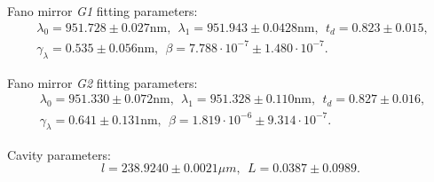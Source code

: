 Fano mirror \emph{G1} fitting parameters:
\begin{equation}
    \begin{split}
        &\lambda_0 = 951.728 \pm 0.027 \text{nm}, \:\: \lambda_1 = 951.943 \pm 0.0428 \text{nm}, \:\: t_d = 0.823 \pm 0.015, \:\: \\&\gamma_{\lambda} = 0.535 \pm 0.056 \text{nm}, \:\: \beta = 7.788 \cdot 10^{-7} \pm 1.480 \cdot 10^{-7}.
    \end{split}
\end{equation}

Fano mirror \emph{G2} fitting parameters:
\begin{equation}
    \begin{split}
        &\lambda_0 = 951.330 \pm 0.072 \text{nm}, \:\: \lambda_1 = 951.328 \pm 0.110 \text{nm}, \:\: t_d = 0.827 \pm 0.016, \:\: \\&\gamma_{\lambda} = 0.641 \pm 0.131 \text{nm}, \:\: \beta = 1.819 \cdot 10^{-6} \pm 9.314 \cdot 10^{-7}.
    \end{split}
\end{equation}

Cavity parameters:
\begin{equation}
    l = 238.9240 \pm 0.0021 \mu m, \:\: L = 0.0387 \pm 0.0989.
\end{equation}

